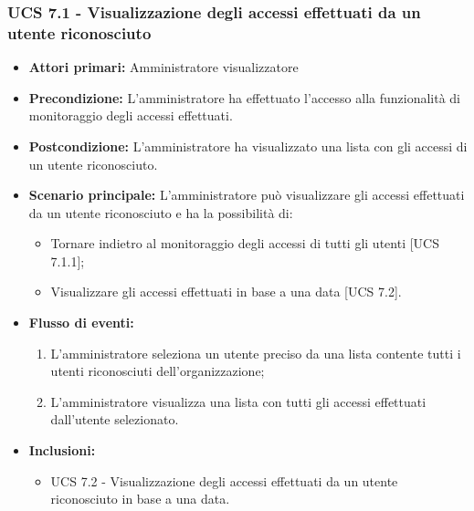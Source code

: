 \subsubsection{UCS 7.1 - Visualizzazione degli accessi effettuati da un utente riconosciuto}
\begin{itemize}
	\item \textbf{Attori primari:} Amministratore visualizzatore
	\item \textbf{Precondizione:} L'amministratore ha effettuato l'accesso alla funzionalità di monitoraggio degli accessi effettuati.
	\item \textbf{Postcondizione:} L'amministratore ha visualizzato una lista con gli accessi di un utente riconosciuto.
	\item \textbf{Scenario principale:} L'amministratore può visualizzare gli accessi effettuati da un utente riconosciuto e ha la possibilità di:
	\begin{itemize}
	\item Tornare indietro al monitoraggio degli accessi di tutti gli utenti [UCS 7.1.1];
	\item Visualizzare gli accessi effettuati in base a una data [UCS 7.2].
	\end{itemize}
	\item \textbf{Flusso di eventi:}
	\begin{enumerate}
	\item L'amministratore seleziona un utente preciso da una lista contente tutti i utenti riconosciuti dell'organizzazione;
	\item L'amministratore visualizza una lista con tutti gli accessi effettuati dall'utente selezionato.
	\end{enumerate}
	\item \textbf{Inclusioni:}
	\begin{itemize}
		\item UCS 7.2 - Visualizzazione degli accessi effettuati da un utente riconosciuto in base a una data.
	\end{itemize}

\end{itemize}

